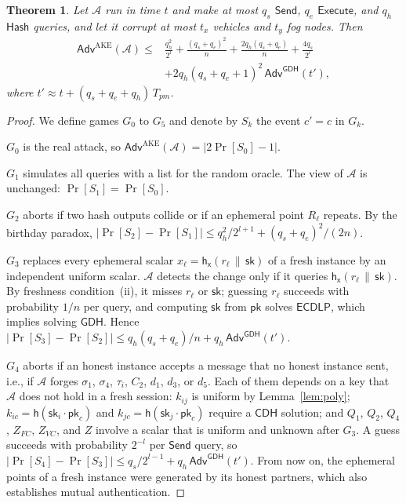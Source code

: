 \documentclass[journal]{IEEEtran}
\theoremstyle{plain}
\newtheorem{theorem}{Theorem}
\theoremstyle{definition}
\newcommand{\Adv}{\mathcal{A}}           %
\newcommand{\h}{\mathsf{h}}              %
\newcommand{\hT}[1]{\h_{\mathsf{#1}}}     %
\newcommand{\sk}{\mathsf{sk}}            %
\newcommand{\pk}{\mathsf{pk}}            %
\newcommand{\Ex}{\mathsf{Execute}}
\newcommand{\Snd}{\mathsf{Send}}
\newcommand{\Hq}{\mathsf{Hash}}
\newcommand{\GDH}{\mathsf{GDH}}
\newcommand{\CDH}{\mathsf{CDH}}
\newcommand{\ECDLP}{\mathsf{ECDLP}}
\newcommand{\cat}{\,\|\,}               %
\newcommand{\Tpm}{T_{pm}}                %
\begin{document}
\begin{theorem}\label{thm:ror}
Let $\Adv$ run in time $t$ and make at most $q_s$ $\Snd$, $q_e$ $\Ex$, and $q_h$ $\Hq$ queries, and let it corrupt at most $t_x$ vehicles and $t_y$ fog nodes. Then
\begin{align*}
\mathsf{Adv}^{\mathrm{AKE}}(\Adv)\le{}& \frac{q_h^2}{2^{l}}+\frac{(q_s+q_e)^2}{n}+\frac{2q_h(q_s+q_e)}{n}+\frac{4q_s}{2^{l}}\\
&+2q_h(q_s+q_e+1)^2\,\mathsf{Adv}^{\GDH}(t'),
\end{align*}
where $t'\approx t+(q_s+q_e+q_h)\,\Tpm$.
\end{theorem}

\begin{proof}
We define games $G_0$ to $G_5$ and denote by $S_k$ the event $c'=c$ in $G_k$.

\emph{$G_0$} is the real attack, so $\mathsf{Adv}^{\mathrm{AKE}}(\Adv)=|2\Pr[S_0]-1|$.

\emph{$G_1$} simulates all queries with a list for the random oracle. The view of $\Adv$ is unchanged: $\Pr[S_1]=\Pr[S_0]$.

\emph{$G_2$} aborts if two hash outputs collide or if an ephemeral point $R_\ell$ repeats. By the birthday paradox, $|\Pr[S_2]-\Pr[S_1]|\le q_h^2/2^{l+1}+(q_s+q_e)^2/(2n)$.

\emph{$G_3$} replaces every ephemeral scalar $x_\ell=\hT{x}(r_\ell\cat\sk)$ of a fresh instance by an independent uniform scalar. $\Adv$ detects the change only if it queries $\hT{x}(r_\ell\cat\sk)$. By freshness condition~(ii), it misses $r_\ell$ or $\sk$; guessing $r_\ell$ succeeds with probability $1/n$ per query, and computing $\sk$ from $\pk$ solves $\ECDLP$, which implies solving $\GDH$. Hence $|\Pr[S_3]-\Pr[S_2]|\le q_h(q_s+q_e)/n+q_h\,\mathsf{Adv}^{\GDH}(t')$.

\emph{$G_4$} aborts if an honest instance accepts a message that no honest instance sent, i.e., if $\Adv$ forges $\sigma_1$, $\sigma_4$, $\tau_i$, $C_2$, $d_1$, $d_3$, or $d_5$. Each of them depends on a key that $\Adv$ does not hold in a fresh session: $k_{ij}$ is uniform by Lemma~\ref{lem:poly}; $k_{ic}=\h(\sk_i\cdot\pk_c)$ and $k_{jc}=\h(\sk_j\cdot\pk_c)$ require a $\CDH$ solution; and $Q_1$, $Q_2$, $Q_4$, $Z_{FC}$, $Z_{VC}$, and $Z$ involve a scalar that is uniform and unknown after $G_3$. A guess succeeds with probability $2^{-l}$ per $\Snd$ query, so $|\Pr[S_4]-\Pr[S_3]|\le q_s/2^{l-1}+q_h\,\mathsf{Adv}^{\GDH}(t')$. From now on, the ephemeral points of a fresh instance were generated by its honest partners, which also establishes mutual authentication.


\end{proof}
\end{document}
